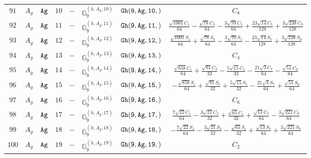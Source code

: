 \documentclass[fleqn,8pt]{jsarticle}
\begin{document}
\begin{table}[ht!]
\begin{center}
\begin{tabular}{cccccccc}
$ 91 $ & $ A_{g} $ & $ {\tt Ag} $ & $ 10 $ & $ - $ & $ \mathbb{G}_{9}^{(h,A_{g},10)} $ & $ {\tt Gh(9,Ag,10,)} $ & $ C_{8} $ \\
$ 92 $ & $ A_{g} $ & $ {\tt Ag} $ & $ 11 $ & $ - $ & $ \mathbb{G}_{9}^{(h,A_{g},11)} $ & $ {\tt Gh(9,Ag,11,)} $ & $ \frac{\sqrt{1001} C_{1}}{64} - \frac{\sqrt{78} C_{3}}{64} - \frac{3 \sqrt{70} C_{5}}{64} + \frac{23 \sqrt{14} C_{7}}{128} + \frac{3 \sqrt{238} C_{9}}{128} $ \\
$ 93 $ & $ A_{g} $ & $ {\tt Ag} $ & $ 12 $ & $ - $ & $ \mathbb{G}_{9}^{(h,A_{g},12)} $ & $ {\tt Gh(9,Ag,12,)} $ & $ \frac{\sqrt{1001} S_{1}}{64} + \frac{\sqrt{78} S_{3}}{64} - \frac{3 \sqrt{70} S_{5}}{64} - \frac{23 \sqrt{14} S_{7}}{128} + \frac{3 \sqrt{238} S_{9}}{128} $ \\
$ 94 $ & $ A_{g} $ & $ {\tt Ag} $ & $ 13 $ & $ - $ & $ \mathbb{G}_{9}^{(h,A_{g},13)} $ & $ {\tt Gh(9,Ag,13,)} $ & $ C_{4} $ \\
$ 95 $ & $ A_{g} $ & $ {\tt Ag} $ & $ 14 $ & $ - $ & $ \mathbb{G}_{9}^{(h,A_{g},14)} $ & $ {\tt Gh(9,Ag,14,)} $ & $ \frac{\sqrt{858} C_{1}}{64} + \frac{\sqrt{91} C_{3}}{32} - \frac{5 \sqrt{15} C_{5}}{32} - \frac{21 \sqrt{3} C_{7}}{64} - \frac{\sqrt{51} C_{9}}{64} $ \\
$ 96 $ & $ A_{g} $ & $ {\tt Ag} $ & $ 15 $ & $ - $ & $ \mathbb{G}_{9}^{(h,A_{g},15)} $ & $ {\tt Gh(9,Ag,15,)} $ & $ - \frac{\sqrt{858} S_{1}}{64} + \frac{\sqrt{91} S_{3}}{32} + \frac{5 \sqrt{15} S_{5}}{32} - \frac{21 \sqrt{3} S_{7}}{64} + \frac{\sqrt{51} S_{9}}{64} $ \\
$ 97 $ & $ A_{g} $ & $ {\tt Ag} $ & $ 16 $ & $ - $ & $ \mathbb{G}_{9}^{(h,A_{g},16)} $ & $ {\tt Gh(9,Ag,16,)} $ & $ C_{6} $ \\
$ 98 $ & $ A_{g} $ & $ {\tt Ag} $ & $ 17 $ & $ - $ & $ \mathbb{G}_{9}^{(h,A_{g},17)} $ & $ {\tt Gh(9,Ag,17,)} $ & $ \frac{7 \sqrt{22} C_{1}}{64} - \frac{3 \sqrt{21} C_{3}}{32} + \frac{\sqrt{65} C_{5}}{32} + \frac{\sqrt{13} C_{7}}{64} - \frac{3 \sqrt{221} C_{9}}{64} $ \\
$ 99 $ & $ A_{g} $ & $ {\tt Ag} $ & $ 18 $ & $ - $ & $ \mathbb{G}_{9}^{(h,A_{g},18)} $ & $ {\tt Gh(9,Ag,18,)} $ & $ - \frac{7 \sqrt{22} S_{1}}{64} - \frac{3 \sqrt{21} S_{3}}{32} - \frac{\sqrt{65} S_{5}}{32} + \frac{\sqrt{13} S_{7}}{64} + \frac{3 \sqrt{221} S_{9}}{64} $ \\
$ 100 $ & $ A_{g} $ & $ {\tt Ag} $ & $ 19 $ & $ - $ & $ \mathbb{G}_{9}^{(h,A_{g},19)} $ & $ {\tt Gh(9,Ag,19,)} $ & $ C_{2} $ \\
 \hline \hline
\end{tabular}
\end{center}
\end{table}
\end{document}
